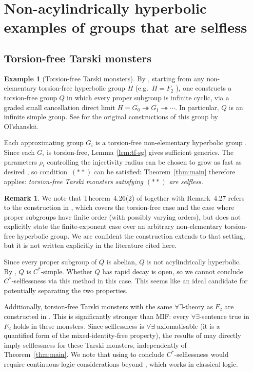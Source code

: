 \documentclass[12pt]{amsart}
\theoremstyle{plain}
\theoremstyle{definition}
\newtheorem{remark}[theorem]{Remark}
\newtheorem{example}[theorem]{Example}
\newcommand{\Cstar}{C^*}
\begin{document}
\section{Non-acylindrically hyperbolic examples of groups that are selfless}\label{sec:examples}

\subsection{Torsion-free Tarski monsters}

\begin{example}[Torsion-free Tarski monsters]\label{ex:tarski-tf}
By \cite[Theorem~4.26(2)]{OOS}, starting from any non-elementary torsion-free
hyperbolic group $H$ (e.g.\ $H = F_2$ ), one constructs a torsion-free group $Q$
in which every proper subgroup is infinite cyclic, via a graded small cancellation
direct limit $H = G_0 \twoheadrightarrow G_1 \twoheadrightarrow \cdots$.
In particular, $Q$ is an infinite simple group. See \cite{O791, O93} for the original constructions of this group by Ol'shanskii. 

Each approximating group $G_i$ is a torsion-free non-elementary hyperbolic group
\cite[Theorem~4.26(2), Lemma~4.13(a)]{OOS}.
Since each $G_i$ is torsion-free, Lemma~\ref{lem:tf-sg} gives sufficient generics.
The parameters $\rho_i$ controlling the injectivity radius can be chosen to grow
as fast as desired \cite[Theorem~4.26]{OOS}, so condition~$(**)$ can be satisfied:
Theorem~\ref{thm:main} therefore applies: \emph{torsion-free Tarski monsters
satisfying $(**)$ are selfless.}

\begin{remark}
We note that Theorem~4.26(2) of \cite{OOS} together with Remark~4.27 refers
to the construction in \cite{O93}, which covers the torsion-free case and the
case where proper subgroups have finite order (with possibly varying orders), but
does not explicitly state the finite-exponent case over an arbitrary
non-elementary torsion-free hyperbolic group.
We are confident the construction extends to that setting, but it is not
written explicitly in the literature cited here.
\end{remark}

Since every proper subgroup of $Q$ is abelian, $Q$ is not acylindrically  hyperbolic.
By \cite{BKKO}, $Q$ is $\Cstar$-simple. Whether $Q$ has rapid decay is open, so we cannot conclude $\Cstar$-selflessness via this method in this case. This seems like an ideal candidate for potentially separating the two properties.

Additionally, torsion-free Tarski monsters with the same $\forall\exists$-theory as $F_2$ are constructed in \cite{CFFH}. This is significantly stronger than MIF: every $\forall\exists$-sentence true in $F_2$ holds in these monsters. Since selflessness is $\forall\exists$-axiomatisable (it is a quantified form of the mixed-identity-free property), the results of \cite{CFFH} may directly imply selflessness for these Tarski monsters, independently of Theorem~\ref{thm:main}. We note that using \cite{CFFH} to conclude $\Cstar$-selflessness would require continuous-logic considerations beyond \cite{CFFH}, which works in classical logic.
\end{example}
\end{document}

